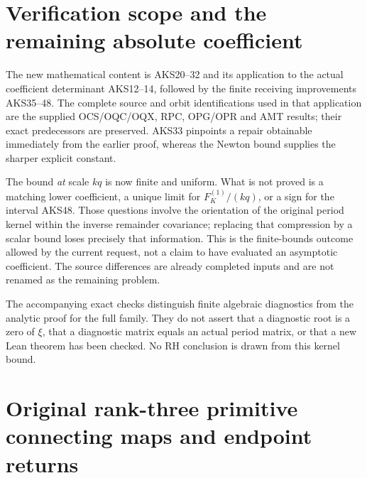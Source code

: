 \section{Verification scope and the remaining absolute coefficient}
\label{aks:sec:AKS-scope}

The new mathematical content is AKS20--32 and its application to the
actual coefficient determinant AKS12--14, followed by the finite
receiving improvements AKS35--48. The complete source and orbit
identifications used in that application are the supplied OCS/OQC/OQX,
RPC, OPG/OPR and AMT results; their exact predecessors are preserved.
AKS33 pinpoints a repair obtainable immediately from the earlier proof,
whereas the Newton bound supplies the sharper explicit constant.

The bound \emph{at} scale $kq$ is now finite and uniform. What is not
proved is a matching lower coefficient, a unique limit for
$F_K^{(1)}/(kq)$, or a sign for the interval AKS48. Those questions involve
the orientation of the original period kernel within the inverse
remainder covariance; replacing that compression by a scalar bound
loses precisely that information. This is the finite-bounds outcome
allowed by the current request, not a claim to have evaluated an
asymptotic coefficient. The source differences are already completed
inputs and are not renamed as the remaining problem.

The accompanying exact checks distinguish finite algebraic diagnostics
from the analytic proof for the full family. They do not assert that a
diagnostic root is a zero of $\xi$, that a diagnostic matrix equals an
actual period matrix, or that a new Lean theorem has been checked.
No RH conclusion is drawn from this kernel bound.

\endgroup

\clearpage
\begingroup


\setcounter{equation}{0}
\renewcommand{\theequation}{PRT.\arabic{equation}}
\section*{Original rank-three primitive connecting maps and endpoint returns}
\clearpage
\label{prt:MPBUILD:PRT_CONNECTING_ENDPOINT_RETURN:start}
